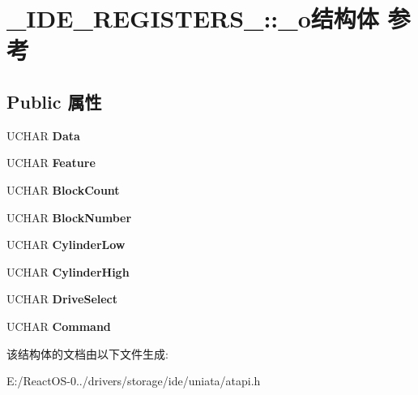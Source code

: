 \hypertarget{struct___i_d_e___r_e_g_i_s_t_e_r_s__1_1_1__o}{}\section{\+\_\+\+I\+D\+E\+\_\+\+R\+E\+G\+I\+S\+T\+E\+R\+S\+\_\+:\+:\+\_\+o结构体 参考}
\label{struct___i_d_e___r_e_g_i_s_t_e_r_s__1_1_1__o}
\subsection*{Public 属性}
\begin{DoxyCompactItemize}
\item 
\mbox{\label{struct___i_d_e___r_e_g_i_s_t_e_r_s__1_1_1__o_a3a10024bd48cae8f2ab6dd15349e9d94}} 
U\+C\+H\+AR {\bfseries Data}
\item 
\mbox{\label{struct___i_d_e___r_e_g_i_s_t_e_r_s__1_1_1__o_a3ab4e26a2d079f2946ab77b23018fd34}} 
U\+C\+H\+AR {\bfseries Feature}
\item 
\mbox{\label{struct___i_d_e___r_e_g_i_s_t_e_r_s__1_1_1__o_a2a0307d8832f417ccfe770b2674f006e}} 
U\+C\+H\+AR {\bfseries Block\+Count}
\item 
\mbox{\label{struct___i_d_e___r_e_g_i_s_t_e_r_s__1_1_1__o_a805f1e07649a1c83ec7904e6f4f1f255}} 
U\+C\+H\+AR {\bfseries Block\+Number}
\item 
\mbox{\label{struct___i_d_e___r_e_g_i_s_t_e_r_s__1_1_1__o_a5c46fbad31f1d17a927b6220761bfdee}} 
U\+C\+H\+AR {\bfseries Cylinder\+Low}
\item 
\mbox{\label{struct___i_d_e___r_e_g_i_s_t_e_r_s__1_1_1__o_a5fc1ef578f2e1cd2af1029fdc21e7485}} 
U\+C\+H\+AR {\bfseries Cylinder\+High}
\item 
\mbox{\label{struct___i_d_e___r_e_g_i_s_t_e_r_s__1_1_1__o_afbe489d2c477a4ab5bef8b8101b1fae6}} 
U\+C\+H\+AR {\bfseries Drive\+Select}
\item 
\mbox{\label{struct___i_d_e___r_e_g_i_s_t_e_r_s__1_1_1__o_af7a513889468a63ddcbf805292fa6097}} 
U\+C\+H\+AR {\bfseries Command}
\end{DoxyCompactItemize}


该结构体的文档由以下文件生成\+:\begin{DoxyCompactItemize}
\item 
E\+:/\+React\+O\+S-\/0../drivers/storage/ide/uniata/atapi.\+h\end{DoxyCompactItemize}
